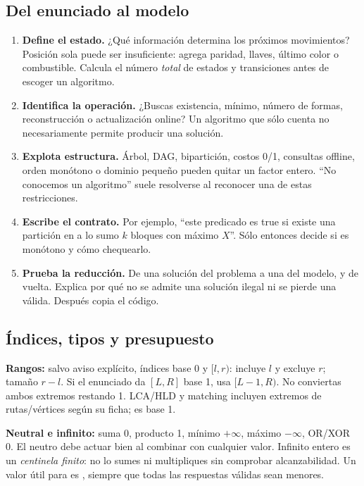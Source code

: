 \subsection{Del enunciado al modelo}
\begin{enumerate}
\item \textbf{Define el estado.} ¿Qué información determina los próximos movimientos? Posición sola puede ser insuficiente: agrega paridad, llaves, último color o combustible. Calcula el número \emph{total} de estados y transiciones antes de escoger un algoritmo.
\item \textbf{Identifica la operación.} ¿Buscas existencia, mínimo, número de formas, reconstrucción o actualización online? Un algoritmo que sólo cuenta no necesariamente permite producir una solución.
\item \textbf{Explota estructura.} Árbol, DAG, bipartición, costos 0/1, consultas offline, orden monótono o dominio pequeño pueden quitar un factor entero. ``No conocemos un algoritmo'' suele resolverse al reconocer una de estas restricciones.
\item \textbf{Escribe el contrato.} Por ejemplo, ``este predicado es true si existe una partición en a lo sumo $k$ bloques con máximo $X$''. Sólo entonces decide si es monótono y cómo chequearlo.
\item \textbf{Prueba la reducción.} De una solución del problema a una del modelo, y de vuelta. Explica por qué no se admite una solución ilegal ni se pierde una válida. Después copia el código.
\end{enumerate}

\subsection{Índices, tipos y presupuesto}
\textbf{Rangos:} salvo aviso explícito, índices base 0 y $[l,r)$: incluye $l$ y excluye $r$; tamaño $r-l$. Si el enunciado da $[L,R]$ base 1, usa $[L-1,R)$. No conviertas ambos extremos restando 1. LCA/HLD y matching incluyen extremos de rutas/vértices según su ficha;  es base 1.

\textbf{Neutral e infinito:} suma 0, producto 1, mínimo $+\infty$, máximo $-\infty$, OR/XOR 0. El neutro debe actuar bien al combinar con cualquier valor. Infinito entero es un \emph{centinela finito}: no lo sumes ni multipliques sin comprobar alcanzabilidad. Un valor útil para  es , siempre que todas las respuestas válidas sean menores.

